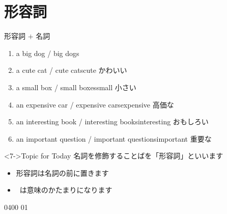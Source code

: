 \documentclass[aspectratio=169,xcolor={dvipsnames,table}]{beamer}
\begin{document}
\section{形容詞}
\begin{frame}[plain]{形容詞 $+$ 名詞}
  \begin{enumerate}[<+->]
    \item a big dog / big dogs
    \item a cute cat / cute cats\hfill{\scriptsize cute  かわいい}
    \item a small box / small boxes\hfill{\scriptsize small  小さい}
    \item an expensive car / expensive cars\hfill{\scriptsize expensive  高価な}
    \item an interesting book / interesting books\hfill{\scriptsize interesting  おもしろい}
    \item an important question / important questions\hfill{\scriptsize important  重要な}
  \end{enumerate}

  \begin{block}<7->{Topic for Today}\small
    名詞を修飾することばを「形容詞」といいます
    \begin{itemize}[square]\small
      \item<8-> 形容詞は名詞の前に置きます
      \item<9-> \,\,\,は意味のかたまりになります
    \end{itemize}
  \end{block}

  \mbox{}\hfill{\tiny 0400}\,{\scriptsize {}}\,{\tiny 01}
\end{frame}
\end{document}
